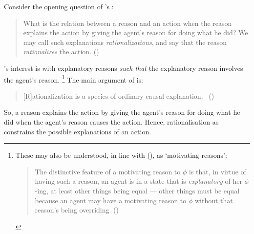 \begin{note}
  Consider the opening question of \citeauthor{Davidson:1963aa}'s :
  \begin{quote}
    What is the relation between a reason and an action when the reason explains the action by giving the agent's reason for doing what he did?
    We may call such explanations \emph{rationalizations}, and say that the reason \emph{rationalizes} the action.%
    \mbox{}\hfill\mbox{(\citeyear[685]{Davidson:1963aa})}
  \end{quote}
  \citeauthor{Davidson:1963aa}'s interest is with explanatory reasons \emph{such that} the explanatory reason involves the agent's reason.%
  \footnote{
    These may also be understood, in line with \citeauthor{Smith:1994wo} (\citeyear{Smith:1994wo}), as `motivating reasons':
    \begin{quote}
      The distinctive feature of a motivating reason to \(\phi\) is that, in virtue of having such a reason, an agent is in a state that is \emph{explanatory} of her \(\phi\)-ing, at least other things being equal --- other things must be equal because an agent may have a motivating reason to \(\phi\) without that reason's being overriding.%
      \mbox{}\hfill\mbox{(\citeyear[96]{Smith:1994wo})}
    \end{quote}
  }
  The main argument of  is:
  \begin{quote}
    [R]ationalization is a species of ordinary causal explanation.%
    \mbox{ }\hfill\mbox{(\citeyear[685]{Davidson:1963aa})}
  \end{quote}
  So, a reason explains the action by giving the agent's reason for doing what he did when the agent's reason causes the action.
  Hence, rationalisation as \cExpl{} constrains the possible explanations of an action.
\end{note}

